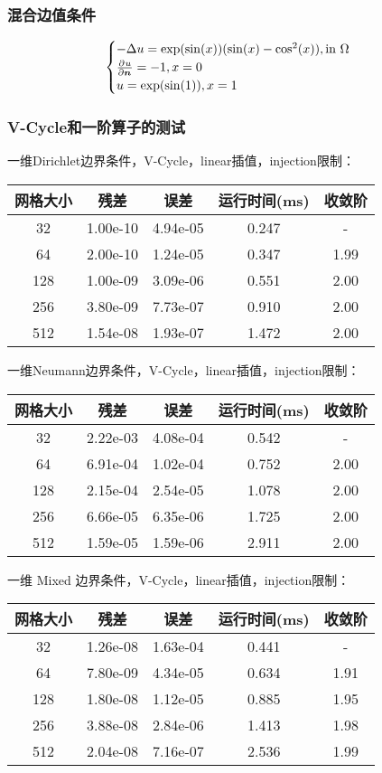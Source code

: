 \documentclass[lang=cn,a4paper,newtx,bibend=bibtex]{elegantpaper}
\begin{document}
\subsubsection{混合边值条件}

\[
  \begin{cases} 
  -\Delta u = \exp(\sin(x)) (\sin(x) - \cos^2(x)), \text{in} ~\Omega \\
  \frac{\partial^{}{u}}{\partial {\bm{n}}^{}} = -1, x = 0 \\
  u = \exp(\sin(1)), x = 1
   \end{cases}
\]

\subsubsection{V-Cycle和一阶算子的测试}

一维Dirichlet边界条件，V-Cycle，linear插值，injection限制：

\begin{longtable}{|c|cccc|} \hline
网格大小 & 残差 & 误差 & 运行时间(ms) & 收敛阶 \\ \hline
32 	& 1.00e-10	& 4.94e-05	& 0.247  & - \\ \hline
64 	& 2.00e-10	& 1.24e-05	& 0.347  & 1.99 \\ \hline
128	& 1.00e-09	& 3.09e-06	& 0.551  & 2.00 \\ \hline
256	& 3.80e-09	& 7.73e-07	& 0.910  & 2.00 \\ \hline
512	& 1.54e-08	& 1.93e-07	& 1.472  & 2.00 \\ \hline
\end{longtable}

一维Neumann边界条件，V-Cycle，linear插值，injection限制：

\begin{longtable}{|c|cccc|} \hline
网格大小 & 残差 & 误差 & 运行时间(ms) & 收敛阶 \\ \hline
32 	& 2.22e-03	& 4.08e-04	& 0.542  & - \\ \hline
64 	& 6.91e-04	& 1.02e-04	& 0.752  & 2.00 \\ \hline
128	& 2.15e-04	& 2.54e-05	& 1.078  & 2.00 \\ \hline
256	& 6.66e-05	& 6.35e-06	& 1.725  & 2.00 \\ \hline
512	& 1.59e-05	& 1.59e-06	& 2.911  & 2.00 \\ \hline
\end{longtable}

一维 Mixed 边界条件，V-Cycle，linear插值，injection限制：

\begin{longtable}{|c|cccc|} \hline
网格大小 & 残差 & 误差 & 运行时间(ms) & 收敛阶 \\ \hline
32 	& 1.26e-08	& 1.63e-04	& 0.441  & - \\ \hline
64 	& 7.80e-09	& 4.34e-05	& 0.634  & 1.91 \\ \hline
128	& 1.80e-08	& 1.12e-05	& 0.885  & 1.95 \\ \hline
256	& 3.88e-08	& 2.84e-06	& 1.413  & 1.98 \\ \hline
512	& 2.04e-08	& 7.16e-07	& 2.536  & 1.99 \\ \hline
\end{longtable}
\end{document}
